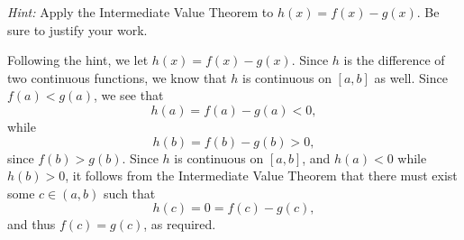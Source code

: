 \documentclass[12pt]{article}
\begin{document}
\begin{enumerate}
\medskip

\textit{Hint:} Apply the Intermediate Value Theorem to $h(x)=f(x)-g(x)$. Be sure to justify your work.

\bigskip

Following the hint, we let $h(x)=f(x)-g(x)$. Since $h$ is the difference of two continuous functions, we know that $h$ is continuous on $[a,b]$ as well. Since $f(a)<g(a)$, we see that 
\[
h(a) = f(a)-g(a)<0,
\]
while
\[
h(b) = f(b)-g(b)>0,
\]
since $f(b)>g(b)$. Since $h$ is continuous on $[a,b]$, and $h(a)<0$ while $h(b)>0$, it follows from the Intermediate Value Theorem that there must exist some $c\in (a,b)$ such that 
\[
h(c) = 0 = f(c)-g(c),
\]
and thus $f(c)=g(c)$, as required.
\end{enumerate}
\end{document}

